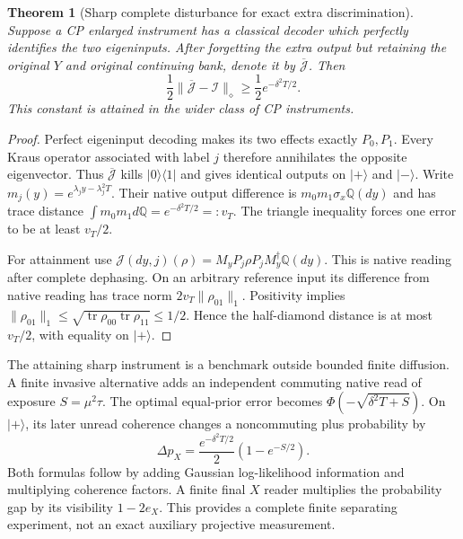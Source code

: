 \documentclass[11pt,oneside,openany]{book}
\newtheorem{theorem}{Theorem}[chapter]
\theoremstyle{definition}
\theoremstyle{remark}\newtheorem{remark}[theorem]{Remark}
\begin{document}
\begin{theorem}[Sharp complete disturbance for exact extra discrimination]
\label{cpc:thm:disturbance}
Suppose a CP enlarged instrument has a classical decoder which perfectly identifies the two eigeninputs. After forgetting the extra output but retaining the original $Y$ and original continuing bank, denote it by $\overline{\mathcal J}$. Then
\begin{equation}
 \frac12\|\overline{\mathcal J}-\mathcal I\|_\diamond
 \ge\frac12e^{-\delta^2T/2}.
 \label{cpc:eq:disturbance}
\end{equation}
This constant is attained in the wider class of CP instruments.
\end{theorem}
\begin{proof}
Perfect eigeninput decoding makes its two effects exactly $P_0,P_1$. Every Kraus operator associated with label $j$ therefore annihilates the opposite eigenvector. Thus $\overline{\mathcal J}$ kills $|0\rangle\langle1|$ and gives identical outputs on $|+\rangle$ and $|-\rangle$. Write $m_j(y)=e^{\lambda_jy-\lambda_j^2T}$. Their native output difference is $m_0m_1\sigma_x\mathbb Q(dy)$ and has trace distance
$\int m_0m_1d\mathbb Q=e^{-\delta^2T/2}=:v_T$.
The triangle inequality forces one error to be at least $v_T/2$.

For attainment use $\mathcal J(dy,j)(\rho)=M_yP_j\rho P_jM_y^\dagger\mathbb Q(dy)$. This is native reading after complete dephasing. On an arbitrary reference input its difference from native reading has trace norm $2v_T\|\rho_{01}\|_1$. Positivity implies $\|\rho_{01}\|_1\le\sqrt{\operatorname{tr}\rho_{00}\operatorname{tr}\rho_{11}}\le1/2$. Hence the half-diamond distance is at most $v_T/2$, with equality on $|+\rangle$.
\end{proof}

The attaining sharp instrument is a benchmark outside bounded finite diffusion. A finite invasive alternative adds an independent commuting native read of exposure $S=\mu^2\tau$. The optimal equal-prior error becomes $\Phi(-\sqrt{\delta^2T+S})$. On $|+\rangle$, its later unread coherence changes a noncommuting plus probability by
\begin{equation}
 \Delta p_X=\frac{e^{-\delta^2T/2}}2(1-e^{-S/2}).
 \label{cpc:eq:finiteinvasive}
\end{equation}
Both formulas follow by adding Gaussian log-likelihood information and multiplying coherence factors. A finite final $X$ reader multiplies the probability gap by its visibility $1-2e_X$. This provides a complete finite separating experiment, not an exact auxiliary projective measurement.
\end{document}
